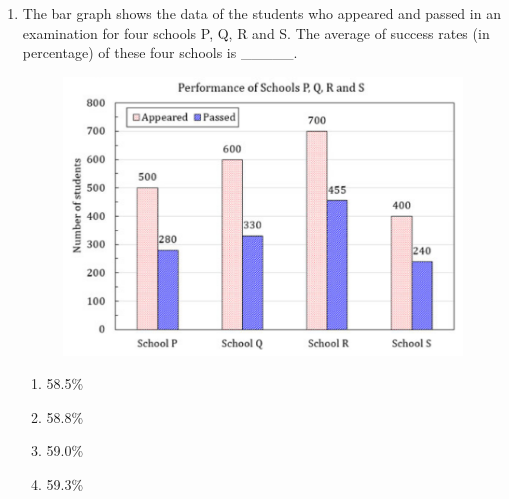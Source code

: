 \documentclass[12pt,onecolumn]{article}
\begin{document}
\begin{enumerate}
    \item The bar graph shows the data of the students who appeared and passed in an examination for four schools P, Q, R and S. The average of success rates (in percentage) of these four schools is \_\_\_\_\_.
          \begin{figure}[H]
              \centering
              \includegraphics[scale=0.4]{q10}
              \label{fig:q10}
          \end{figure}
          \begin{enumerate}
              \item 58.5\%
              \item 58.8\%
              \item 59.0\%
              \item 59.3\%
          \end{enumerate}

\end{enumerate}
\end{document}
